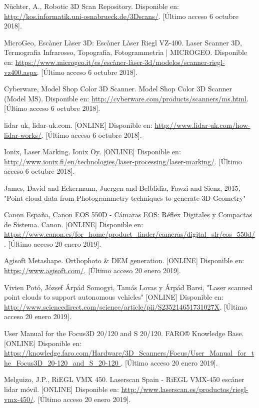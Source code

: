 \begin{thebibliography}{99}
 Nüchter, A., Robotic 3D Scan Repository. Disponible en: \url{http://kos.informatik.uni-osnabrueck.de/3Dscans/}. [Último acceso 6 octubre 2018].


 MicroGeo, Escàner Làser 3D: Escàner Làser Riegl VZ-400. Laser Scanner 3D, Termografia Infrarosso, Topografia, Fotogrammetria | MICROGEO. Disponible en: \url{https://www.microgeo.it/es/escàner-làser-3d/modelos/scanner-riegl-vz400.aspx}. [Último acceso 6 octubre 2018].


 Cyberware, Model Shop Color 3D Scanner. Model Shop Color 3D Scanner (Model MS). Disponible en: \url{http://cyberware.com/products/scanners/ms.html}. [Último acceso 6 octubre 2018].


 lidar uk, lidar-uk.com. [ONLINE] Disponible en: \url{http://www.lidar-uk.com/how-lidar-works/}. [Último acceso 6 octubre 2018].

 Ionix, Laser Marking. Ionix Oy. [ONLINE] Disponible en: \url{http://www.ionix.fi/en/technologies/laser-processing/laser-marking/}. [Último acceso 6 octubre 2018].


 James, David and Eckermann, Juergen and Belblidia, Fawzi and Sienz, 2015, "Point cloud data from Photogrammetry techniques to generate 3D Geometry"

 Canon España, Canon EOS 550D - Cámaras EOS: Réflex Digitales y Compactas de Sistema. Canon. [ONLINE] Disponible en: \url{https://www.canon.es/for_home/product_finder/cameras/digital_slr/eos_550d/}. [Último acceso 20 enero 2019].

 Agisoft Metashape. Orthophoto \& DEM generation. [ONLINE] Disponible en: \url{https://www.agisoft.com/}. [Último acceso 20 enero 2019].

 Vivien Potó, József Árpád Somogyi, Tamás Lovas y Árpád Barsi, "Laser scanned point clouds to support autonomous vehicles" [ONLINE] Disponible en: \url{http://www.sciencedirect.com/science/article/pii/S235214651731027X}. [Último acceso 20 enero 2019].


 User Manual for the Focus3D 20/120 and S 20/120. FARO® Knowledge Base. [ONLINE] Disponible en: \url{https://knowledge.faro.com/Hardware/3D_Scanners/Focus/User_Manual_for_the_Focus3D_20-120_and_S_20-120 }. [Último acceso 20 enero 2019].


 Melguizo, J.P., RiEGL VMX 450. Laserscan Spain - RiEGL VMX-450 escáner lidar móvil. [ONLINE] Disponible en: \url{http://www.laserscan.es/productos/riegl-vmx-450/}. [Último acceso 20 enero 2019].




\end{thebibliography}
